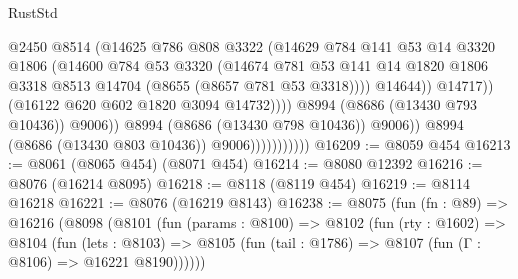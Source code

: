 \begin{lexlean}{RustStd}
\begin{coremodule}
                                            @2450
                                            @8514
                                            (@14625
                                              @786
                                              @808
                                              @3322
                                              (@14629
                                                @784
                                                @141
                                                @53
                                                @14
                                                @3320
                                                @1806
                                                (@14600
                                                  @784
                                                  @53
                                                  @3320
                                                  (@14674
                                                    @781
                                                    @53
                                                    @141
                                                    @14
                                                    @1820
                                                    @1806
                                                    @3318
                                                    @8513
                                                    @14704
                                                    (@8655 (@8657 @781 @53 @3318))))
                                                @14644))
                                            @14717))
                                        (@16122 @620 @602 @1820 @3094 @14732))))
                                  @8994
                                  (@8686 (@13430 @793 @10436))
                                  @9006))
                              @8994
                              (@8686 (@13430 @798 @10436))
                              @9006))
                          @8994
                          (@8686 (@13430 @803 @10436))
                          @9006)))))))))))
@16209 := @8059 @454
@16213 := @8061 (@8065 @454) (@8071 @454)
@16214 := @8080 @12392
@16216 := @8076 (@16214 @8095)
@16218 := @8118 (@8119 @454)
@16219 := @8114 @16218
@16221 := @8076 (@16219 @8143)
@16238 := @8075
    (fun (fn : @89) =>
    @16216
      (@8098
        (@8101
          (fun (params : @8100) =>
          @8102
            (fun (rty : @1602) =>
            @8104
              (fun (lets : @8103) =>
              @8105 (fun (tail : @1786) => @8107 (fun (Γ : @8106) => @16221 @8190))))))

\end{coremodule}
\end{lexlean}
